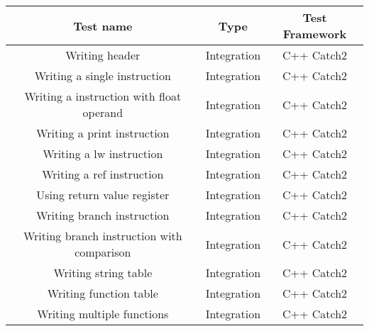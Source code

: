 \documentclass[manuscript,screen,nonacm]{acmart}
\begin{document}
\begin{center}
\begin{tabular}{|c|c|c|}
    \hline
    Test name & Type & Test Framework \\
    \hline
    Writing header & Integration & C++ Catch2 \\
    Writing a single instruction & Integration & C++ Catch2 \\
    Writing a instruction with float operand & Integration & C++ Catch2 \\
    Writing a print instruction & Integration & C++ Catch2 \\
    Writing a lw instruction & Integration & C++ Catch2 \\
    Writing a ref instruction & Integration & C++ Catch2 \\
    Using return value register & Integration & C++ Catch2 \\
    Writing branch instruction & Integration & C++ Catch2 \\
    Writing branch instruction with comparison & Integration & C++ Catch2 \\
    Writing string table & Integration & C++ Catch2 \\
    Writing function table & Integration & C++ Catch2 \\
    Writing multiple functions & Integration & C++ Catch2 \\
    \hline
\end{tabular}
\end{center}
\end{document}

